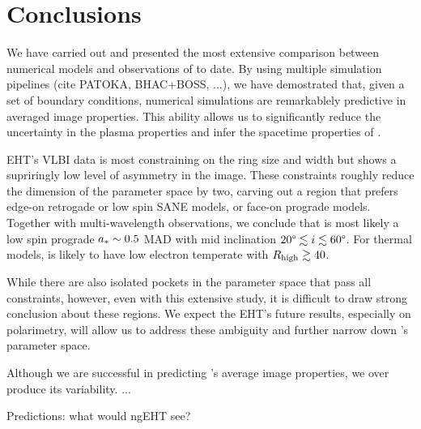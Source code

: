 \section{Conclusions}\label{sec:conclusions}


We have carried out and presented the most extensive comparison
between numerical models and observations of \sgra to date.
By using multiple simulation pipelines (cite PATOKA, BHAC+BOSS, ...),
we have demostrated that, given a set of boundary conditions,
numerical simulations are remarkablely predictive in averaged image
properties.
This ability allows us to significantly reduce the uncertainty in the
plasma properties and infer the spacetime properties of \sgra.

EHT's VLBI data is most constraining on the ring size and width but
shows a supriringly low level of asymmetry in the image.
These constraints roughly reduce the dimension of the parameter space
by two, carving out a region that prefers edge-on retrogade or low
spin SANE models, or face-on prograde models.
Together with multi-wavelength observations, we conclude that \sgra is
most likely a low spin prograde $a_* \sim 0.5$ MAD with mid
inclination $20\degree \lesssim i \lesssim 60\degree$.
For thermal models, \sgra is likely to have low electron temperate
with $R_\mathrm{high} \gtrsim 40$.

While there are also isolated pockets in the parameter space that pass
all constraints, however, even with this extensive study, it is
difficult to draw strong conclusion about these regions.
We expect the EHT's future results, especially on polarimetry, will
allow us to address these ambiguity and further narrow down \sgra's
parameter space.

Although we are successful in predicting \sgra's average image
properties, we over produce its variability.
...

Predictions: what would ngEHT see?
